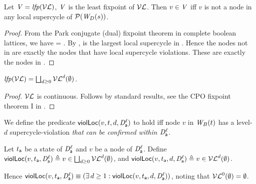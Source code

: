 \begin{proposition} \label{prop:LFPisLocScViolations}
Let  $\VS= \lfp{\lVFs}$, \ie $\VS$ is the least fixpoint of $\lVFs$. Then $v \in \VS$ iff 
$v$ is not a node in any local supercycle of $\lwfgS{B}{s}{\DS}$.
\end{proposition}
%
\begin{proof}
From the Park conjugate (dual) fixpoint theorem in complete boolean lattices, we have 
\lfp{\VFs} = \compl{\gfp{\SFs}}.
By  , \gfp{\SFs} is the largest local supercycle in . Hence the nodes not in 
\gfp{\SFs} are exactly the nodes that have local supercycle violations. These are exactly the nodes in \lfp{\VFs}.
\end{proof}



\begin{proposition} \label{prop:computeLocLFP}
$\lfp{\lVFs} = \JOIN_{d \ge 0} \lVFs^{d} (\ewfg)$.
\end{proposition}
%
\begin{proof}
$\lVFs$ is continuous. Follows by standard results, \eg see the CPO fixpoint theorem I in 
\cite{DP02}.
\end{proof}










We define the predicate $\lviol{v}{d}{t}{\act}{\l}$ to hold iff node $v$ in $\wfg{B}{t}$ has a level-$d$ supercycle-violation
\emph{that can be confirmed within $\dsk{\act}{\l}$}.

\begin{definition}
\label{def:supercycle.violation.local}
\label{defn:supercycle.violation.local}
Let $t_\act$ be a state of $\dsk{\act}{\l}$ and $v$ be a node of $\dsk{\act}{\l}$.
Define 
$\scVL{v}{t_\act}{\act}{\l} \df v \in \JOIN_{d \ge 0} \lVFs^{d} (\ewfg)$, and 
$\scVLd{v}{d}{t_\act}{\act}{\l} \df v \in \lVFs^{d} (\ewfg)$.
\end{definition}
Hence $\scVL{v}{t_\act}{\act}{\l} \ev (\ex d \ge 1: \scVLd{v}{d}{t_\act}{\act}{\l})$, noting that 
$\lVFs^{0} (\ewfg) = \ewfg$.


